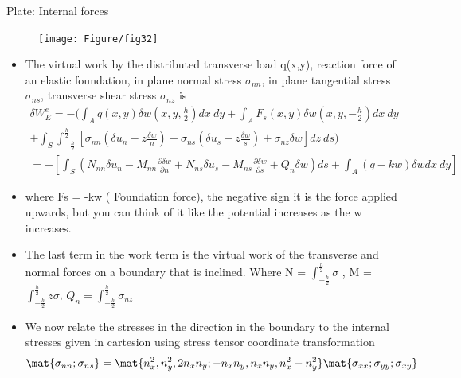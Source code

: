 	\begin{frame}{Plate: Internal forces}
		\begin{figure}
			\centering
			\texttt{[image: Figure/fig32]} 		
		\end{figure}
	\end{frame}


	\begin{frame}
		\begin{itemize}
			\item The virtual work by the distributed transverse load q(x,y), reaction force of an elastic foundation, in plane normal stress $\sigma_{nn}$, in plane tangential stress $\sigma_{ns}$, transverse shear stress $\sigma_{nz}$ is 
			\begin{equation}
			\begin{aligned}
				\delta W_E^e = - (\int_A q(x,y) \delta w(x,y,\frac{h}{2}) dx~dy + 
				\int_A F_s(x,y) \delta w(x,y,-\frac{h}{2}) dx~dy
				\\	+ \int_S \int_{-\frac{h}{2}}^{\frac{h}{2}} \left[ \sigma_{nn} \left(\delta u_n - z \frac{\delta w}{n} \right) + \sigma_{ns} \left(\delta u_s - z \frac{\delta w}{s}\right) 
				+ \sigma_{nz}\delta w\right] dz~ds ) \\ 
				= - \left[ \int_S \left(N_{nn}\delta u_n - M_{nn}\frac{\partial \delta w}{\partial n}
							+ N_{ns}\delta u_s 
				            - M_{ns}\frac{\partial \delta w}{\partial s} + Q_n \delta w \right)ds
				            + \int_A (q-kw)\delta w dx~dy
				 \right] 
			\end{aligned}
			\end{equation}
			\item where Fs = -kw ( Foundation force), the negative sign it is the force applied upwards, but you can think of it like the potential increases as the w increases.
			\item The last term in the work term is the virtual work of the transverse and normal forces on a boundary that is inclined. Where N = $\int_{-\frac{h}{2}}^{\frac{h}{2}}\sigma$ ,  M = $\int_{-\frac{h}{2}}^{\frac{h}{2}}z\sigma$, $Q_n = \int_{-\frac{h}{2}}^{\frac{h}{2}}\sigma_{nz}$ 
		\end{itemize}
	\end{frame}


	\begin{frame}
	\begin{itemize}
		\item We now relate the stresses in the direction in the boundary to the internal stresses given in cartesion using stress tensor coordinate transformation
			\begin{equation}
			   \mat{\sigma_{nn}; \sigma_{ns}} = \mat{n_x^2,n_y^2,2n_xn_y ; -n_xn_y,n_xn_y,n_x^2 - n_y^2} \mat{\sigma_{xx};\sigma_{yy};\sigma_{xy}}
			\end{equation}
	\end{itemize}
	\end{frame}


